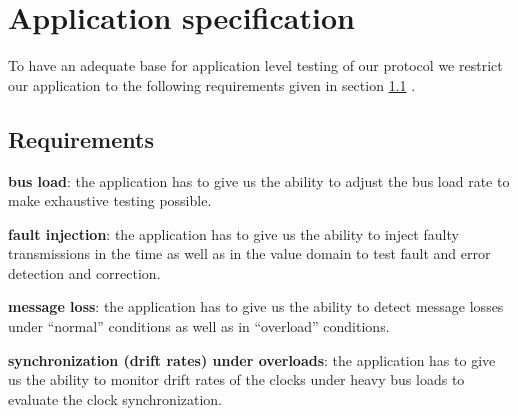\section{Application specification}
\label{sec:app:specification}

To have an adequate base for application level testing of our protocol we restrict our application to the following requirements given in section \ref{sec:app:specification:req} .\\

\subsection{Requirements}
\label{sec:app:specification:req}

\begin{req}
\label{req:app:load}
\textbf{bus load}: the application has to give us the ability to adjust the bus load rate to make exhaustive testing possible.
\end{req}

\begin{req}
\label{req:app:fault_injection}
\textbf{fault injection}: the application has to give us the ability to inject faulty transmissions in the time as well as in the value domain to test fault and error detection and correction.
\end{req}

\begin{req}
\label{req:app:message_loss}
\textbf{message loss}: the application has to give us the ability to detect message losses under ``normal'' conditions as well as in ``overload'' conditions.
\end{req}


\begin{req}
\label{req:app:sync_under_overloads}
\textbf{synchronization (drift rates) under overloads}: the application has to give us the ability to monitor drift rates of the clocks under heavy bus loads to evaluate the clock synchronization.
\end{req}


